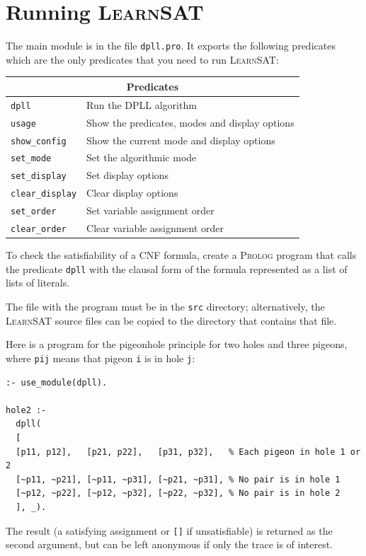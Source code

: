 \documentclass[11pt]{article}
\newcommand*{\p}[1]{\textup{\texttt{#1}}}
\newcommand*{\ls}{\textsc{LearnSAT}}
\newcommand*{\pl}{\textsc{Prolog}}
\begin{document}
\newpage

\section{Running \ls}

The main module is in the file \p{dpll.pro}. It exports the following
predicates which are the only predicates that you need to run \ls{}:

\begin{center}
\begin{tabular}{|l|l|}
\hline
\multicolumn{2}{|c|}{\textbf{\large Predicates}}\\
\hline
\p{dpll}&Run the DPLL algorithm\\
\p{usage}&Show the predicates, modes and display options \\
\p{show\_config}&Show the current mode and display options\\
\p{set\_mode}&Set the algorithmic mode\\
\p{set\_display}&Set display options\\
\p{clear\_display}&Clear display options\\
\p{set\_order}&Set variable assignment order\\
\p{clear\_order}&Clear variable assignment order\\
\hline
\end{tabular}
\end{center}

To check the satisfiability of a CNF formula, create a \pl{} program
that calls the predicate \p{dpll} with the clausal form of the formula
represented as a list of lists of literals.

The file with the program must be in the \p{src} directory;
alternatively, the \ls{} source files can be copied to the directory
that contains that file.

Here is a program for the pigeonhole principle for two holes and three
pigeons, where \p{pij} means that pigeon \p{i} is in hole \p{j}:

\begin{verbatim}
:- use_module(dpll).

hole2 :-
  dpll(
  [
  [p11, p12],   [p21, p22],   [p31, p32],   % Each pigeon in hole 1 or 2 
  [~p11, ~p21], [~p11, ~p31], [~p21, ~p31], % No pair is in hole 1
  [~p12, ~p22], [~p12, ~p32], [~p22, ~p32], % No pair is in hole 2
  ], _).
\end{verbatim}

The result (a satisfying assignment or \p{[]} if unsatisfiable) is
returned as the second argument, but can be left anonymous if only
the trace is of interest.
\end{document}
